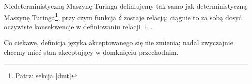 \begin{definition}
    Niedeterministyczną Maszynę Turinga definiujemy tak samo jak deterministyczną Maszynę Turinga\footnote{Patrz: sekcja \ref{dmt}}, przy czym funkcja \( \delta \) zostaje relacją; ciągnie to za sobą dosyć oczywiste konsekwencje w definiowaniu relacji \( \vdash\).
    
    Co ciekawe, definicja języka akceptowanego się nie zmienia; nadal zwyczajnie chcemy mieć stan akceptujący w domknięciu przechodnim.
\end{definition}